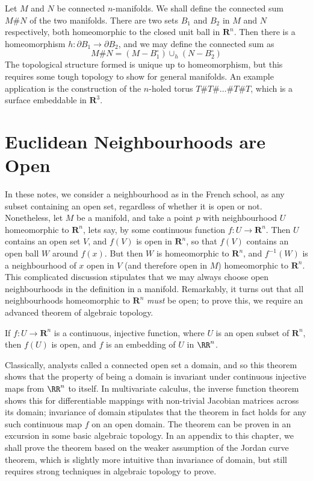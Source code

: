 \begin{example}
    Let $M$ and $N$ be connected $n$-manifolds. We shall define the connected sum $M \# N$ of the two manifolds. There are two sets $B_1$ and $B_2$ in $M$ and $N$ respectively, both homeomorphic to the closed unit ball in $\mathbf{R}^n$. Then there is a homeomorphism $h:\partial B_1 \to \partial B_2$, and we may define the connected sum as
    \[ M \# N = (M - B_1^\circ) \cup_h (N - B_2^\circ) \]
    The topological structure formed is unique up to homeomorphism, but this requires some tough topology to show for general manifolds. An example application is the construction of the $n$-holed torus $T \# T \# \dots \# T \# T$, which is a surface embeddable in $\mathbf{R}^3$.
\end{example}

\section{Euclidean Neighbourhoods are Open}

In these notes, we consider a neighbourhood as in the French school, as any subset containing an open set, regardless of whether it is open or not. Nonetheless, let $M$ be a manifold, and take a point $p$ with neighbourhood $U$ homeomorphic to $\mathbf{R}^n$, lets say, by some continuous function $f: U \to \mathbf{R}^n$. Then $U$ contains an open set $V$, and $f(V)$ is open in $\mathbf{R}^n$, so that $f(V)$ contains an open ball $W$ around $f(x)$. But then $W$ is homeomorphic to $\mathbf{R}^n$, and $f^{-1}(W)$ is a neighbourhood of $x$ open in $V$ (and therefore open in $M$) homeomorphic to $\mathbf{R}^n$. This complicated discussion stipulates that we may always choose open neighbourhoods in the definition in a manifold. Remarkably, it turns out that all neighbourhoods homeomorphic to $\mathbf{R}^n$ {\it must} be open; to prove this, we require an advanced theorem of algebraic topology.


\begin{theorem}
    If $f:U \to \mathbf{R}^n$ is a continuous, injective function, where $U$ is an open subset of $\mathbf{R}^n$, then $f(U)$ is open, and $f$ is an embedding of $U$ in $\RR^n$.
\end{theorem}

Classically, analysts called a connected open set a domain, and so this theorem shows that the property of being a domain is invariant under continuous injective maps from $\RR^n$ to itself. In multivariate calculus, the inverse function theorem shows this for differentiable mappings with non-trivial Jacobian matrices across its domain; invariance of domain stipulates that the theorem in fact holds for any such continuous map $f$ on an open domain. The theorem can be proven in an excursion in some basic algebraic topology. In an appendix to this chapter, we shall prove the theorem based on the weaker assumption of the Jordan curve theorem, which is slightly more intuitive than invariance of domain, but still requires strong techniques in algebraic topology to prove.

